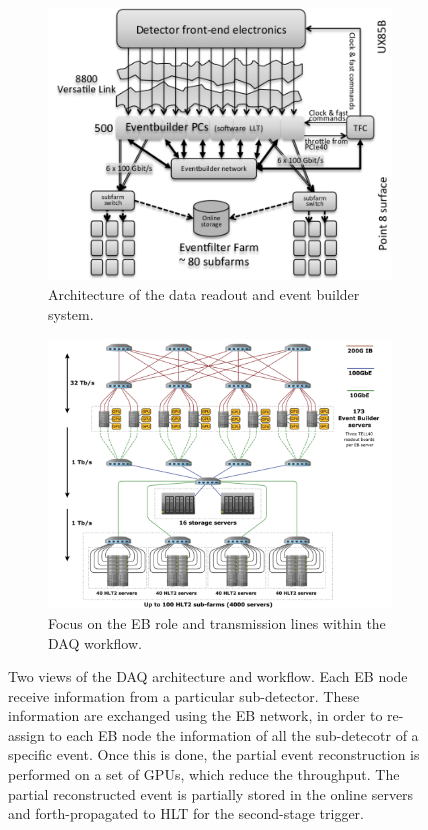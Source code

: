 \begin{figure}
    \centering
    \begin{subfigure}{0.48\textwidth}
        \includegraphics[width=\linewidth]{figures/The-architecture-of-Upgraded-LHCb-readout-system.png}
    \caption{Architecture of the data readout and event builder system.}
    \label{fig:architecture_readout}
    \end{subfigure}
    \begin{subfigure}{0.48\textwidth}
         \includegraphics[width=\linewidth]{figures/RTA_trigger.png}
    \caption{Focus on the EB role and transmission lines within the DAQ workflow.}\label{fig:EB_zoom}
    \end{subfigure}
    \caption{Two views of the DAQ architecture and workflow. Each EB node receive information from a particular sub-detector. These information are exchanged using the EB network, in order to re-assign to each EB node the information of all the sub-detecotr of a specific event. Once this is done, the partial event reconstruction is performed on a set of GPUs, which reduce the throughput. The partial reconstructed event is partially stored in the online servers and forth-propagated to HLT for the second-stage trigger.}\label{fig:general_overview_trigger_RTA}
\end{figure}



